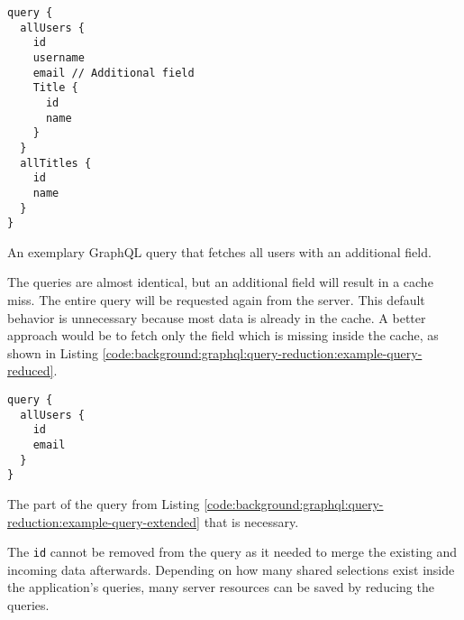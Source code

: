 \ifshowListings
\begin{listing}[H]
    \begin{verbatim}
query {
  allUsers {
    id
    username
    email // Additional field
    Title {
      id
      name
    }
  }
  allTitles {
    id
    name
  }
}
    \end{verbatim}
    \caption{An exemplary GraphQL query that fetches all users with an additional field.}\label{code:background:graphql:query-reduction:example-query-extended}
\end{listing}
\fi

\noindent The queries are almost identical, but an additional field will result in a cache miss. The entire query will be requested again from the server. This default behavior is unnecessary because most data is already in the cache. A better approach would be to fetch only the field which is missing inside the cache, as shown in Listing \ref{code:background:graphql:query-reduction:example-query-reduced}.

\ifshowListings
\begin{listing}[H]
    \begin{verbatim}
query {
  allUsers {
    id
    email
  }
}
    \end{verbatim}
    \caption{The part of the query from Listing \ref{code:background:graphql:query-reduction:example-query-extended} that is necessary.}\label{code:background:graphql:query-reduction:example-query-reduced}
\end{listing}
\fi

\noindent The \texttt{id} cannot be removed from the query as it needed to merge the existing and incoming data afterwards. Depending on how many shared selections exist inside the application's queries, many server resources can be saved by reducing the queries.
